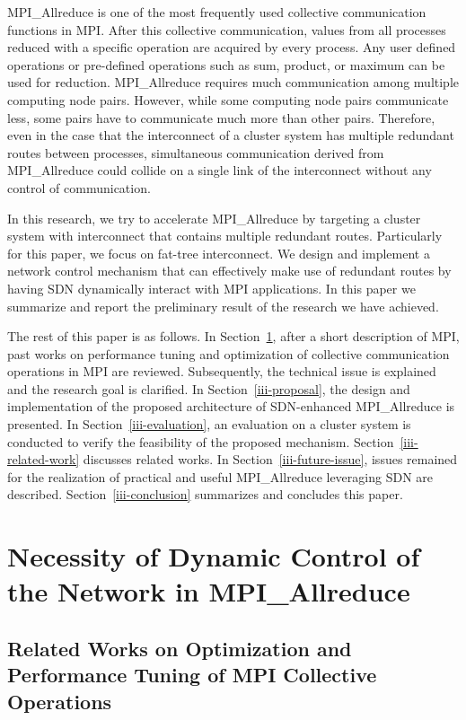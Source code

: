 MPI\_Allreduce is one of the most frequently used collective communication
functions in MPI\@. After this collective communication, values from all
processes reduced with a specific operation are acquired by every process. Any
user defined operations or pre-defined operations such as sum, product, or
maximum can be used for reduction. MPI\_Allreduce requires much communication
among multiple computing node pairs. However, while some computing node pairs
communicate less, some pairs have to communicate much more than other pairs.
Therefore, even in the case that the interconnect of a cluster system has
multiple redundant routes between processes, simultaneous communication
derived from MPI\_Allreduce could collide on a single link of the interconnect
without any control of communication.

In this research, we try to accelerate MPI\_Allreduce by targeting a cluster
system with interconnect that contains multiple redundant routes. Particularly
for this paper, we focus on fat-tree interconnect. We design and implement a
network control mechanism that can effectively make use of redundant routes by
having SDN dynamically interact with MPI applications. In this paper we
summarize and report the preliminary result of the research we have achieved.

The rest of this paper is as follows. In
Section~\ref{iii-background},
after a short description of MPI, past works on performance tuning and
optimization of collective communication operations in MPI are reviewed.
Subsequently, the technical issue is explained and the research goal is
clarified. In Section~\ref{iii-proposal}, the design and
implementation of the proposed architecture of SDN-enhanced MPI\_Allreduce is
presented. In Section~\ref{iii-evaluation}, an evaluation on a cluster system is
conducted to verify the feasibility of the proposed mechanism.
Section~\ref{iii-related-work} discusses related works. In
Section~\ref{iii-future-issue}, issues remained for the realization of practical
and useful MPI\_Allreduce leveraging SDN are described.
Section~\ref{iii-conclusion} summarizes and concludes this paper.

\section{Necessity of Dynamic Control of the Network in
MPI\_Allreduce}\label{iii-background}

\subsection{Related Works on Optimization and Performance Tuning of MPI
Collective Operations}

